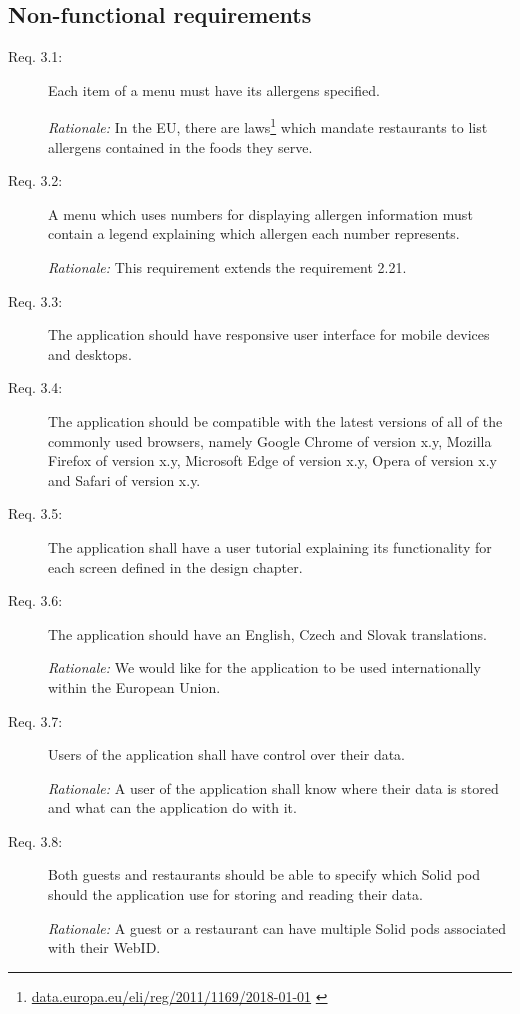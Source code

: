 \newpage

\subsection{Non-functional requirements}
\begin{description}
    \item [Req. 3.1:] Each item of a menu must have its allergens specified.
    
    \emph{Rationale:} In the EU, there are laws\footnote{\url{data.europa.eu/eli/reg/2011/1169/2018-01-01}  \label{fnlabel}} which mandate restaurants to list allergens contained in the foods they serve.
    \item [Req. 3.2:] A menu which uses numbers for displaying allergen information must contain a legend explaining which allergen each number represents.

    \emph{Rationale:} This requirement extends the requirement 2.21.
    \item [Req. 3.3:] The application should have responsive user interface for mobile devices and desktops.
    \item [Req. 3.4:] The application should be compatible with the latest versions of all of the commonly used browsers, namely Google Chrome of version x.y, Mozilla Firefox of version x.y, Microsoft Edge of version x.y, Opera of version x.y and Safari of version x.y.
    \item [Req. 3.5:] The application shall have a user tutorial explaining its functionality for each screen defined in the design chapter.
    \item [Req. 3.6:] The application should have an English, Czech and Slovak translations.

    \emph{Rationale:} We would like for the application to be used internationally within the European Union.
    \item [Req. 3.7:] Users of the application shall have control over their data.

    \emph{Rationale:} A user of the application shall know where their data is stored and what can the application do with it.
    \item [Req. 3.8:] Both guests and restaurants should be able to specify which Solid pod should the application use for storing and reading their data.

    \emph{Rationale:} A guest or a restaurant can have multiple Solid pods associated with their WebID.
\end{description}

\vspace*{\fill}